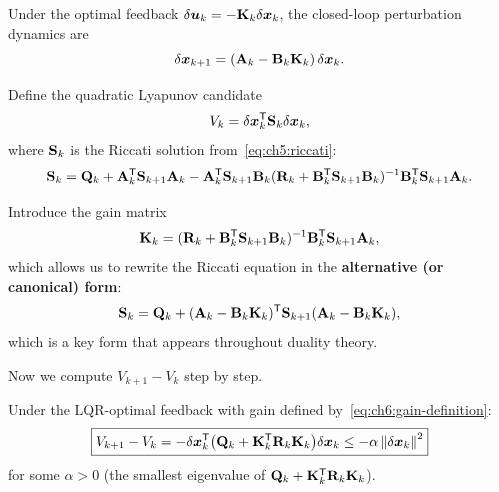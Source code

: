 Under the optimal feedback $\delta\bm{u}_k = -\mathbf{K}_k\delta\bm{x}_k$, the closed-loop perturbation dynamics are
\begin{equation}
\delta\bm{x}_{k+1} = (\mathbf{A}_k - \mathbf{B}_k\mathbf{K}_k)\,\delta\bm{x}_k.
\label{eq:ch6:closed-loop}
\end{equation}

Define the quadratic Lyapunov candidate
\begin{equation}
V_k = \delta\bm{x}_k^{\mathsf{T}}\mathbf{S}_k\delta\bm{x}_k,
\label{eq:ch6:lyapunov-candidate}
\end{equation}
where $\mathbf{S}_k$ is the Riccati solution from~\eqref{eq:ch5:riccati}:
\begin{equation}
\mathbf{S}_k = \mathbf{Q}_k + \mathbf{A}_k^{\mathsf{T}} \mathbf{S}_{k+1} \mathbf{A}_k - \mathbf{A}_k^{\mathsf{T}} \mathbf{S}_{k+1} \mathbf{B}_k
(\mathbf{R}_k + \mathbf{B}_k^{\mathsf{T}} \mathbf{S}_{k+1} \mathbf{B}_k)^{-1} \mathbf{B}_k^{\mathsf{T}} \mathbf{S}_{k+1} \mathbf{A}_k.
\label{eq:ch6:riccati-full}
\end{equation}

Introduce the gain matrix
\begin{equation}
\mathbf{K}_k = (\mathbf{R}_k + \mathbf{B}_k^{\mathsf{T}} \mathbf{S}_{k+1} \mathbf{B}_k)^{-1} \mathbf{B}_k^{\mathsf{T}} \mathbf{S}_{k+1} \mathbf{A}_k,
\label{eq:ch6:gain-definition}
\end{equation}
which allows us to rewrite the Riccati equation in the \textbf{alternative (or canonical) form}:
\begin{equation}
\mathbf{S}_k = \mathbf{Q}_k + (\mathbf{A}_k - \mathbf{B}_k\mathbf{K}_k)^{\mathsf{T}} \mathbf{S}_{k+1} (\mathbf{A}_k - \mathbf{B}_k\mathbf{K}_k),
\label{eq:ch6:riccati-alt-form}
\end{equation}
which is a key form that appears throughout duality theory.

Now we compute $V_{k+1} - V_k$ step by step.

\begin{theorem}[Value Decrease = Contraction Certificate]
\label{thm:ch6:duality}
Under the LQR-optimal feedback with gain defined by~\eqref{eq:ch6:gain-definition}:
\begin{equation}
\boxed{
V_{k+1} - V_k = -\delta\bm{x}_k^{\mathsf{T}}\bigl(\mathbf{Q}_k + \mathbf{K}_k^{\mathsf{T}}\mathbf{R}_k\mathbf{K}_k\bigr)\delta\bm{x}_k \leq -\alpha\left\lVert \delta\bm{x}_k \right\rVert^2
}
\label{eq:ch6:value-drop}
\end{equation}
for some $\alpha > 0$ (the smallest eigenvalue of $\mathbf{Q}_k + \mathbf{K}_k^{\mathsf{T}}\mathbf{R}_k\mathbf{K}_k$).
\end{theorem}

